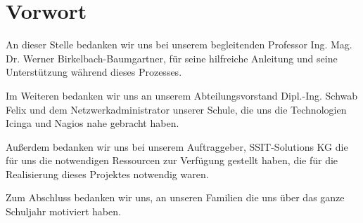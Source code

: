 \chapter{Vorwort}

An dieser Stelle bedanken wir uns bei unserem begleitenden Professor Ing. Mag. Dr. Werner Birkelbach-Baumgartner,
für seine hilfreiche Anleitung und seine Unterstützung während dieses Prozesses.                  

\SuperPar Im Weiteren bedanken wir uns an unserem Abteilungsvorstand Dipl.-Ing. Schwab Felix und dem Netzwerkadministrator unserer Schule,
die uns die Technologien Icinga und Nagios nahe gebracht haben.                 

\SuperPar Außerdem bedanken wir uns bei unserem Auftraggeber, SSIT-Solutions KG die für uns die notwendigen Ressourcen zur Verfügung gestellt haben,
die für die Realisierung dieses Projektes notwendig waren.                     

\SuperPar Zum Abschluss bedanken wir uns, an unseren Familien die uns über das ganze Schuljahr motiviert haben.






